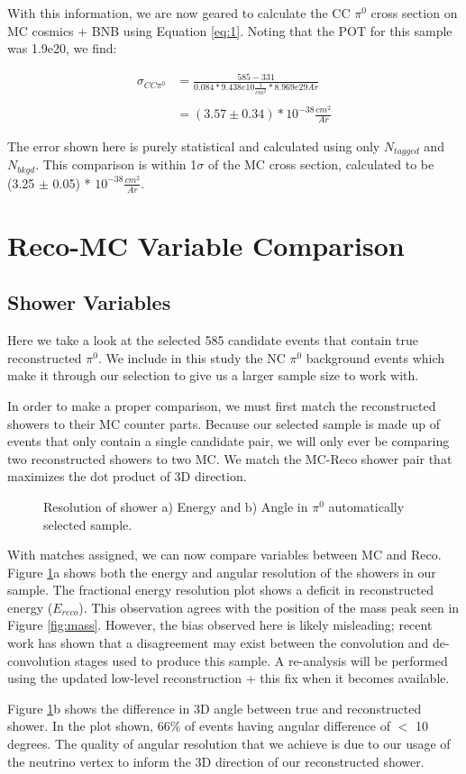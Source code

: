 \documentclass[a4paper]{article}
\begin{document}
With this information, we are now geared to calculate the CC $\pi^0$ cross section on MC cosmics + BNB using Equation \ref{eq:1}. Noting that the POT for this sample was 1.9e20, we find:

\begin{align}
\sigma_{CC\pi^0} &= \frac{585 - 331}{0.084 * 9.438e10 \frac{1}{cm^2} * 8.969e29 Ar} \\\\
&= (3.57 \pm 0.34) *10^{-38} \frac{cm^2}{Ar}
\end{align}

The error shown here is purely statistical and calculated using only $N_{tagged}$ and $N_{bkgd}$. This comparison is within 1$\sigma$ of the MC cross section, calculated to be (3.25 $\pm$ 0.05) * $10^{-38} \frac{cm^2}{Ar}$.

\section{Reco-MC Variable Comparison}
\label{sec:resoltuion}

\subsection{Shower Variables}
Here we take a look at the selected 585 candidate events that contain true reconstructed $\pi^0$. We include in this study the NC $\pi^0$ background events which make it through our selection to give us a larger sample size to work with. 
\par In order to make a proper comparison, we must first match the reconstructed showers to their MC counter parts.  Because our selected sample is made up of events that only contain a single candidate pair, we will only ever be comparing two reconstructed showers to two MC.  We match the MC-Reco shower pair that maximizes the dot product of 3D direction.

\begin{figure}[h!]
\centering
{}
\caption{Resolution of shower a) Energy and b) Angle in $\pi^0$ automatically selected sample. }
\label{fig:gam_res}
\end{figure}

\par With matches assigned, we can now compare variables between MC and Reco.  Figure \ref{fig:gam_res}a shows both the energy and angular resolution of the showers in our sample. The fractional energy resolution plot shows a deficit in reconstructed energy ($E_{reco}$).  This observation agrees with the position of the mass peak seen in Figure \ref{fig:mass}.  However, the bias observed here is likely misleading; recent work has shown that a disagreement may exist between the convolution and de-convolution stages used to produce this sample.  A re-analysis will be performed using the updated low-level reconstruction + this fix when it becomes available. 
\par Figure \ref{fig:gam_res}b shows the difference in 3D angle between true and reconstructed shower.  In the plot shown, 66\% of events having angular difference of $<$ 10 degrees. The quality of angular resolution that we achieve is due to our usage of the neutrino vertex to inform the 3D direction of our reconstructed shower. 
\end{document}
